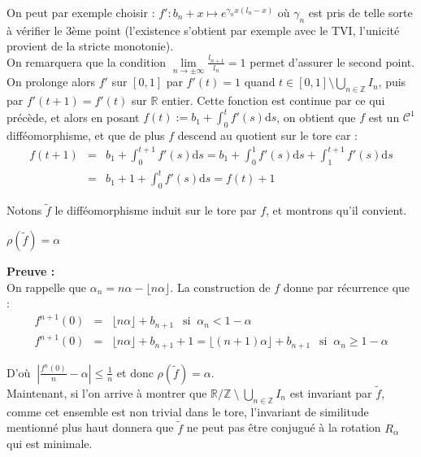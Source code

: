 \documentclass[11pt,a4paper]{article}
\begin{document}
On peut par exemple choisir : $f': b_n + x \mapsto \displaystyle e^{\gamma_n x (l_n -x)} $ où $\gamma_n$ est pris de telle sorte à vérifier le 3ème point (l'existence s'obtient par exemple avec le TVI, l'unicité provient de la stricte monotonie). \\ 
On remarquera que la condition $\displaystyle \lim\limits_{n \to \pm \infty } \frac{l_{n+1}}{l_n} = 1 $ permet d'assurer le second point. \\

On prolonge alors $f'$ sur $[0,1]$ par $f'(t)=1$ quand $\displaystyle t\in [0,1] \setminus \bigcup_{n\in \mathbb{Z}} I_n$, puis par $f'(t+1)=f'(t)$ sur $\mathbb{R}$ entier. Cette fonction est continue par ce qui précède, et alors en posant $f(t) := b_1 + \displaystyle \int_0^t f'(s) \mathrm{d}s$, on obtient que $f$ est un $\mathcal{C}^1$ difféomorphisme, et que de plus $f$ descend au quotient sur le tore car : \\
\begin{eqnarray*}
f(t+1) &=& b_1 +  \int_0^{t+1} f'(s) \mathrm{d}s = b_1 + \int_0^1 f'(s) \mathrm{d}s + \int_1^{t+1} f'(s) \mathrm{d}s \\
&=& b_1 + 1 + \int_0^t f'(s) \mathrm{d}s = f(t) + 1
\end{eqnarray*}

Notons $\tilde{f}$ le difféomorphisme induit sur le tore par $f$, et montrons qu'il convient. 

\begin{lemma} $\rho(\tilde{f})=\alpha$
\end{lemma}

\textbf{Preuve :} \\
On rappelle que $\alpha_n = n\alpha - \lfloor n\alpha \rfloor$. La construction de $f$ donne par récurrence que :
\begin{eqnarray*}
f^{n+1}(0) &=& \lfloor n\alpha \rfloor + b_{n+1} \ \ \text{ si } \ \alpha_n < 1-\alpha \\
f^{n+1}(0) &=&  \lfloor n\alpha \rfloor + b_{n+1} + 1 =  \lfloor (n+1)\alpha \rfloor + b_{n+1}\ \ \text{ si } \ \alpha_n \geq 1-\alpha
\end{eqnarray*}

D'où $ \ \displaystyle |\frac{f^n(0)}{n} - \alpha| \leq \frac{1}{n}$ et donc $\rho(\tilde{f})=\alpha$. \\


Maintenant, si l'on arrive à montrer que $\mathbb{R}/\mathbb{Z} \ \setminus \ \bigcup_{n\in \mathbb{Z}} I_n$ est invariant par $\tilde{f}$, comme cet ensemble est non trivial dans le tore, l'invariant de similitude mentionné plus haut donnera que $\tilde{f}$ ne peut pas être conjugué à la rotation $R_\alpha$ qui est minimale.

\newpage
\printbibliography[heading=bibintoc, title={Références}]
\end{document}
